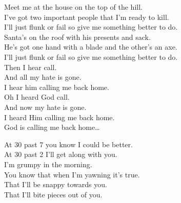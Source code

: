 


Meet me at the house on the top of the hill. \\
I've got two important people that I'm ready to kill. \\
I'll just flunk or fail so give me something better to do. \\

Santa's on the roof with his presents and sack. \\
He's got one hand with a blade and the other's an axe. \\
I'll just flunk or fail so give me something better to do. \\

Then I hear  call. \\
And all my hate is gone. \\
I hear him calling me back home. \\

Oh I heard God call. \\
And now my hate is gone. \\
I heard Him calling me back home. \\

God is calling me back home… \\




At 30 past 7 you know I could be better. \\
At 30 past 2 I'll get along with you. \\
I'm grumpy in the morning. \\
You know that when I'm yawning it's true. \\

That I'll be snappy towards you. \\
That I'll bite pieces out of you. \\





